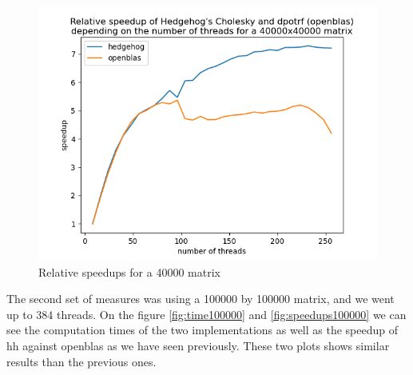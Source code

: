 \begin{figure}[!ht]
  \begin{center}
    \includegraphics[scale=0.8]{img/relative-speedup-40000.png}
    \caption{Relative speedups for a 40000 matrix}
    \label{fig:relativespeedup40000}
  \end{center}
\end{figure}

The second set of measures was using a 100000 by 100000 matrix, and we went up to
384 threads. On the figure \ref{fig:time100000} and \ref{fig:speedups100000} we
can see the computation times of the two implementations as well as the speedup
of \gls{hh} against openblas as we have seen previously. These two plots shows
similar results than the previous ones.

